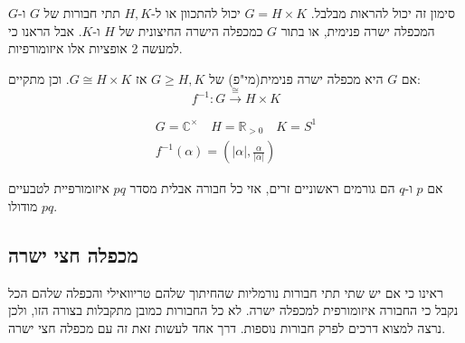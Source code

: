 \documentclass{tstextbook}
\begin{document}
\begin{remark}
סימון זה יכול להראות מבלבל. \(G=H\times K\) יכול להתכוון או ל-\(H,K\) תתי חבורות של \(G\) ו-\(G\) המכפלה ישרה פנימית, או בתור \(G\) כמכפלה הישרה החיצונית של \(H\) ו-\(K\). אבל הראנו כי למעשה 2 אופציות אלו איזומורפיות.

\end{remark}
\begin{corollary}
אם \(G\) היא מכפלה ישרה פנימית(מי"פ) של \(G\geq H,K\) אז \(G\cong H\times K\). וכן מתקיים:
$$f^{-1} :G\xrightarrow{\cong}H\times K$$

\end{corollary}
\begin{example}
$$\begin{gathered}G=\mathbb{C} ^\times \quad H=\mathbb{R} _{>0}\quad K=S^1 \\f^{-1} \left( \alpha \right)=\left( |\alpha|, \frac{\alpha}{|\alpha|} \right)
\end{gathered}$$

\end{example}
\begin{proposition}
אם \(p\) ו-\(q\) הם גורמים ראשוניים זרים, אזי כל חבורה אבלית מסדר \(pq\) איזומורפיית לטבעיים מודולו \(pq\).

\end{proposition}
\subsection{מכפלה חצי ישרה}

ראינו כי אם יש שתי תתי חבורות נורמליות שהחיתוך שלהם טריוואילי והכפלה שלהם הכל נקבל כי החבורה איזומורפית למכפלה ישרה. לא כל החבורות כמובן מתקבלות בצורה הזו, ולכן נרצה למצוא דרכים לפרק חבורות נוספות. דרך אחד לעשות זאת זה עם מכפלה חצי ישרה.
\end{document}
